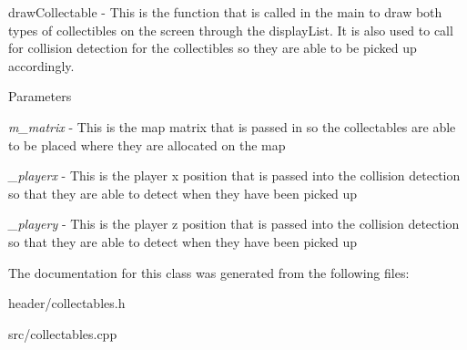 drawCollectable -\/ This is the function that is called in the main to draw both types of collectibles on the screen through the displayList. It is also used to call for collision detection for the collectibles so they are able to be picked up accordingly. 
\begin{DoxyParams}{Parameters}
\item[{\em m\_\-matrix}]-\/ This is the map matrix that is passed in so the collectables are able to be placed where they are allocated on the map \item[{\em \_\-playerx}]-\/ This is the player x position that is passed into the collision detection so that they are able to detect when they have been picked up \item[{\em \_\-playery}]-\/ This is the player z position that is passed into the collision detection so that they are able to detect when they have been picked up \end{DoxyParams}


The documentation for this class was generated from the following files:\begin{DoxyCompactItemize}
\item 
header/collectables.h\item 
src/collectables.cpp\end{DoxyCompactItemize}
